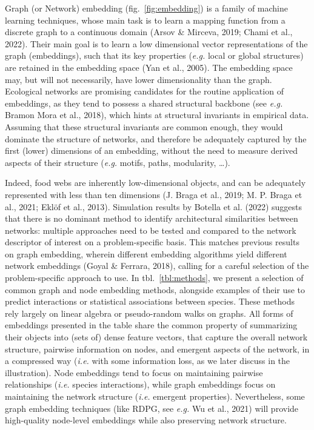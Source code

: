 \documentclass[11pt]{article}
\begin{document}
Graph (or Network) embedding (fig.~\ref{fig:embedding}) is a family of
machine learning techniques, whose main task is to learn a mapping
function from a discrete graph to a continuous domain (Arsov \& Mirceva,
2019; Chami et al., 2022). Their main goal is to learn a low dimensional
vector representations of the graph (embeddings), such that its key
properties (\emph{e.g.} local or global structures) are retained in the
embedding space (Yan et al., 2005). The embedding space may, but will
not necessarily, have lower dimensionality than the graph. Ecological
networks are promising candidates for the routine application of
embeddings, as they tend to possess a shared structural backbone (see
\emph{e.g.} Bramon Mora et al., 2018), which hints at structural
invariants in empirical data. Assuming that these structural invariants
are common enough, they would dominate the structure of networks, and
therefore be adequately captured by the first (lower) dimensions of an
embedding, without the need to measure derived aspects of their
structure (\emph{e.g.} motifs, paths, modularity, \ldots).

Indeed, food webs are inherently low-dimensional objects, and can be
adequately represented with less than ten dimensions (J. Braga et al.,
2019; M. P. Braga et al., 2021; Eklöf et al., 2013). Simulation results
by Botella et al. (2022) suggests that there is no dominant method to
identify architectural similarities between networks: multiple
approaches need to be tested and compared to the network descriptor of
interest on a problem-specific basis. This matches previous results on
graph embedding, wherein different embedding algorithms yield different
network embeddings (Goyal \& Ferrara, 2018), calling for a careful
selection of the problem-specific approach to use. In
tbl.~\ref{tbl:methods}, we present a selection of common graph and node
embedding methods, alongside examples of their use to predict
interactions or statistical associations between species. These methods
rely largely on linear algebra or pseudo-random walks on graphs. All
forms of embeddings presented in the table share the common property of
summarizing their objects into (sets of) dense feature vectors, that
capture the overall network structure, pairwise information on nodes,
and emergent aspects of the network, in a compressed way (\emph{i.e.}
with some information loss, as we later discuss in the illustration).
Node embeddings tend to focus on maintaining pairwise relationships
(\emph{i.e.} species interactions), while graph embeddings focus on
maintaining the network structure (\emph{i.e.} emergent properties).
Nevertheless, some graph embedding techniques (like RDPG, see
\emph{e.g.} Wu et al., 2021) will provide high-quality node-level
embeddings while also preserving network structure.
\end{document}
